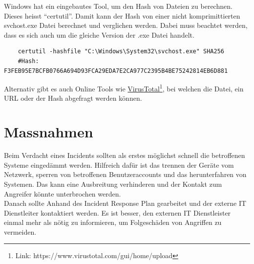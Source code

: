 Windows hat ein eingebautes Tool, um den Hash von Dateien zu berechnen.
Dieses heisst ``certutil''.
Damit kann der Hash von einer nicht komprimittierten svchost.exe Datei berechnet und verglichen werden.
Dabei muss beachtet werden, dass es sich auch um die gleiche Version der .exe Datei handelt.

\begin{lstlisting}
    certutil -hashfile "C:\Windows\System32\svchost.exe" SHA256
    #Hash: F3FEB95E7BCFB0766A694D93FCA29EDA7E2CA977C2395B4BE75242814EB6D881
\end{lstlisting}

Alternativ gibt es auch Online Tools wie \href{https://www.virustotal.com/gui/home/upload}{VirusTotal}\footnote{Link: https://www.virustotal.com/gui/home/upload}, bei welchen die Datei, ein URL oder der Hash abgefragt werden können.

\section{Massnahmen}
Beim Verdacht eines Incidents sollten als erstes möglichst schnell die betroffenen Systeme eingedämmt werden. 
Hilfreich dafür ist das trennen der Geräte vom Netzwerk, sperren von betroffenen Benutzeraccounts und das herunterfahren von Systemen.
Das kann eine Ausbreitung verhinderen und der Kontakt zum Angreifer könnte unterbrochen werden.\\

Danach sollte Anhand des Incident Response Plan gearbeitet und der externe IT Dienstleiter kontaktiert werden.
Es ist besser, den externen IT Dienstleister einmal mehr als nötig zu informieren, um Folgeschäden von Angriffen zu vermeiden. 